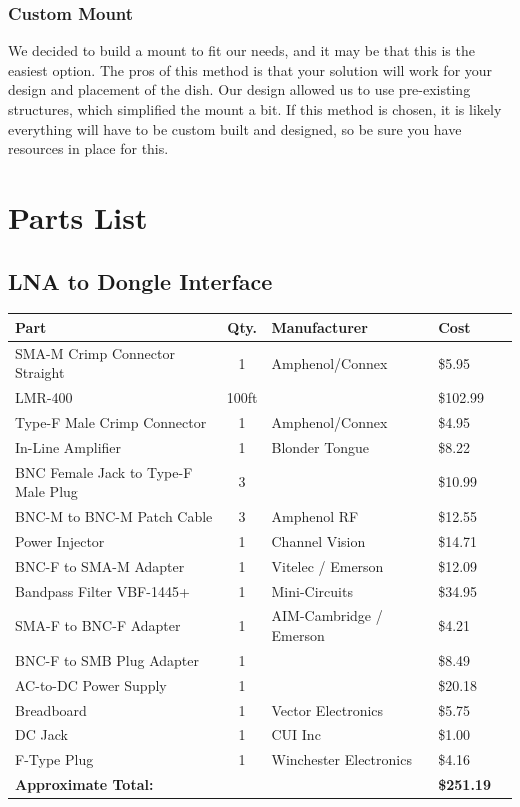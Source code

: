 \documentclass[11pt]{article} %
\begin{document}
\subsubsection{Custom Mount}

We decided to build a mount to fit our needs, and it may be that this is the easiest option. The pros of this method is that your solution will work for your design and placement of the dish. Our design allowed us to use pre-existing structures, which simplified the mount a bit. If this method is chosen, it is likely everything will have to be custom built and designed, so be sure you have resources in place for this. 



\newpage

\section{Parts List}


\subsection{LNA to Dongle Interface}


\begin{tabular}{| p{6cm} | c | p{5cm} | l | c |}
\hline
\textbf{Part} & \textbf{Qty.} & \textbf{Manufacturer} & \textbf{Cost} \\ \hline \hline
SMA-M Crimp Connector Straight & 1 & Amphenol/Connex & \$5.95 \\ \hline
LMR-400 & 100ft & & \$102.99\\ \hline
Type-F Male Crimp Connector & 1 & Amphenol/Connex &\$4.95 \\ \hline
In-Line Amplifier & 1 & Blonder Tongue & \$8.22 \\ \hline
BNC Female Jack to Type-F Male Plug & 3 & & \$10.99 \\ \hline
BNC-M to BNC-M Patch Cable & 3 & Amphenol RF & \$12.55 \\ \hline
Power Injector & 1 & Channel Vision & \$14.71 \\ \hline
BNC-F to SMA-M Adapter & 1 & Vitelec / Emerson & \$12.09 \\ \hline
Bandpass Filter VBF-1445+ & 1 & Mini-Circuits & \$34.95 \\ \hline
SMA-F to BNC-F Adapter & 1 & AIM-Cambridge / Emerson& \$4.21 \\ \hline
BNC-F to SMB Plug Adapter & 1 & & \$8.49 \\ \hline
AC-to-DC Power Supply & 1 & & \$20.18 \\ \hline
Breadboard & 1 & Vector Electronics & \$5.75 \\ \hline
DC Jack & 1 & CUI Inc & \$1.00 \\ \hline
F-Type Plug & 1 & Winchester Electronics & \$4.16\\ \hline
\textbf{Approximate Total:} & & & \textbf{\$251.19} \\ \hline
\end{tabular}
\end{document}
